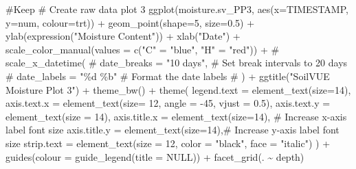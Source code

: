 \documentclass[
  letterpaper,
  DIV=11,
  numbers=noendperiod]{scrartcl}
\newenvironment{Shaded}{\begin{snugshade}}{\end{snugshade}}
\newcommand{\AttributeTok}[1]{\textcolor[rgb]{0.40,0.45,0.13}{#1}}
\newcommand{\CommentTok}[1]{\textcolor[rgb]{0.37,0.37,0.37}{#1}}
\newcommand{\ConstantTok}[1]{\textcolor[rgb]{0.56,0.35,0.01}{#1}}
\newcommand{\DecValTok}[1]{\textcolor[rgb]{0.68,0.00,0.00}{#1}}
\newcommand{\FloatTok}[1]{\textcolor[rgb]{0.68,0.00,0.00}{#1}}
\newcommand{\FunctionTok}[1]{\textcolor[rgb]{0.28,0.35,0.67}{#1}}
\newcommand{\NormalTok}[1]{\textcolor[rgb]{0.00,0.23,0.31}{#1}}
\newcommand{\OtherTok}[1]{\textcolor[rgb]{0.00,0.23,0.31}{#1}}
\newcommand{\SpecialCharTok}[1]{\textcolor[rgb]{0.37,0.37,0.37}{#1}}
\newcommand{\StringTok}[1]{\textcolor[rgb]{0.13,0.47,0.30}{#1}}
\begin{document}
\begin{Shaded}
\begin{Highlighting}[]
\CommentTok{\#Keep }
\CommentTok{\# Create raw data plot 3}
\FunctionTok{ggplot}\NormalTok{(moisture.sv\_PP3, }\FunctionTok{aes}\NormalTok{(}\AttributeTok{x=}\NormalTok{TIMESTAMP, }\AttributeTok{y=}\NormalTok{num, }\AttributeTok{colour=}\NormalTok{trt)) }\SpecialCharTok{+}
  \FunctionTok{geom\_point}\NormalTok{(}\AttributeTok{shape=}\DecValTok{5}\NormalTok{, }\AttributeTok{size=}\FloatTok{0.5}\NormalTok{) }\SpecialCharTok{+} 
  \FunctionTok{ylab}\NormalTok{(}\FunctionTok{expression}\NormalTok{(}\StringTok{"Moisture Content"}\NormalTok{)) }\SpecialCharTok{+}
  \FunctionTok{xlab}\NormalTok{(}\StringTok{"Date"}\NormalTok{) }\SpecialCharTok{+}
  \FunctionTok{scale\_color\_manual}\NormalTok{(}\AttributeTok{values =} \FunctionTok{c}\NormalTok{(}\StringTok{"C"} \OtherTok{=} \StringTok{"blue"}\NormalTok{, }\StringTok{"H"} \OtherTok{=} \StringTok{"red"}\NormalTok{)) }\SpecialCharTok{+}
  \CommentTok{\#  scale\_x\_datetime(}
  \CommentTok{\#   date\_breaks = "10 days",       \# Set break intervals to 20 days}
  \CommentTok{\#    date\_labels = "\%d \%b"       \# Format the date labels}
  \CommentTok{\# ) +}
  \FunctionTok{ggtitle}\NormalTok{(}\StringTok{"SoilVUE Moisture Plot 3"}\NormalTok{) }\SpecialCharTok{+}
  \FunctionTok{theme\_bw}\NormalTok{() }\SpecialCharTok{+}
  \FunctionTok{theme}\NormalTok{(}
    \AttributeTok{legend.text =} \FunctionTok{element\_text}\NormalTok{(}\AttributeTok{size=}\DecValTok{14}\NormalTok{),}
    \AttributeTok{axis.text.x =} \FunctionTok{element\_text}\NormalTok{(}\AttributeTok{size=} \DecValTok{12}\NormalTok{, }\AttributeTok{angle =} \SpecialCharTok{{-}}\DecValTok{45}\NormalTok{, }\AttributeTok{vjust =} \FloatTok{0.5}\NormalTok{),}
    \AttributeTok{axis.text.y =} \FunctionTok{element\_text}\NormalTok{(}\AttributeTok{size =} \DecValTok{14}\NormalTok{),}
    \AttributeTok{axis.title.x =} \FunctionTok{element\_text}\NormalTok{(}\AttributeTok{size=}\DecValTok{14}\NormalTok{),  }\CommentTok{\# Increase x{-}axis label font size}
    \AttributeTok{axis.title.y =} \FunctionTok{element\_text}\NormalTok{(}\AttributeTok{size=}\DecValTok{14}\NormalTok{),}\CommentTok{\# Increase y{-}axis label font size}
    \AttributeTok{strip.text =} \FunctionTok{element\_text}\NormalTok{(}\AttributeTok{size =} \DecValTok{12}\NormalTok{, }\AttributeTok{color =} \StringTok{"black"}\NormalTok{, }\AttributeTok{face =} \StringTok{"italic"}\NormalTok{)}
\NormalTok{  ) }\SpecialCharTok{+}
  \FunctionTok{guides}\NormalTok{(}\AttributeTok{colour =} \FunctionTok{guide\_legend}\NormalTok{(}\AttributeTok{title =} \ConstantTok{NULL}\NormalTok{)) }\SpecialCharTok{+}
  \FunctionTok{facet\_grid}\NormalTok{(. }\SpecialCharTok{\textasciitilde{}}\NormalTok{ depth)}
\end{Highlighting}
\end{Shaded}
\end{document}
